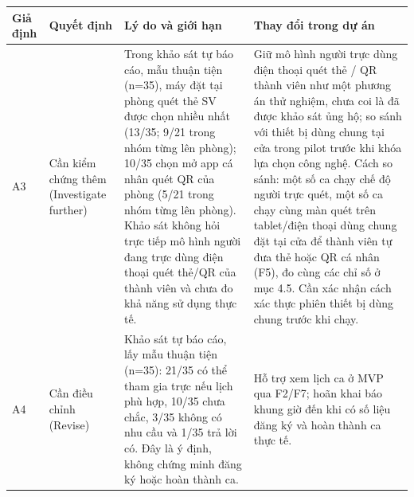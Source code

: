 \clearpage
\small
{\centering
\begin{tabularx}{0.94\textwidth}{|>{\raggedright\arraybackslash}p{}|>{\raggedright\arraybackslash}p{}|>{\raggedright\arraybackslash}p{}|X|}
\hline
\textbf{Giả định} & \textbf{Quyết định} & \textbf{Lý do và giới hạn} & \textbf{Thay đổi trong dự án} \\ \hline
A3 & Cần kiểm chứng thêm (Investigate further) & Trong khảo sát tự báo cáo, mẫu thuận tiện (n=35), máy đặt tại phòng quét thẻ SV được chọn nhiều nhất (13/35; 9/21 trong nhóm từng lên phòng); 10/35 chọn mở app cá nhân quét QR của phòng (5/21 trong nhóm từng lên phòng). Khảo sát không hỏi trực tiếp mô hình người đang trực dùng điện thoại quét thẻ/QR của thành viên và chưa đo khả năng sử dụng thực tế. & Giữ mô hình người trực dùng điện thoại quét thẻ / QR thành viên như một phương án thử nghiệm, chưa coi là đã được khảo sát ủng hộ; so sánh với thiết bị dùng chung tại cửa trong pilot trước khi khóa lựa chọn công nghệ. Cách so sánh: một số ca chạy chế độ người trực quét, một số ca chạy cùng màn quét trên tablet/điện thoại dùng chung đặt tại cửa để thành viên tự đưa thẻ hoặc QR cá nhân (F5), đo cùng các chỉ số ở mục 4.5. Cần xác nhận cách xác thực phiên thiết bị dùng chung trước khi chạy. \\ \hline
A4 & Cần điều chỉnh (Revise) & Khảo sát tự báo cáo, lấy mẫu thuận tiện (n=35): 21/35 có thể tham gia trực nếu lịch phù hợp, 10/35 chưa chắc, 3/35 không có nhu cầu và 1/35 trả lời có. Đây là ý định, không chứng minh đăng ký hoặc hoàn thành ca. & Hỗ trợ xem lịch ca ở MVP qua F2/F7; hoãn khai báo khung giờ đến khi có số liệu đăng ký và hoàn thành ca thực tế. \\ \hline
\end{tabularx}\par}
\clearpage
\footnotesize
